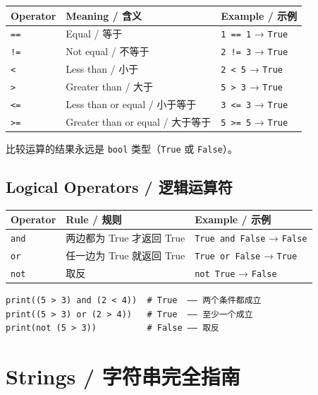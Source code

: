 \documentclass[11pt,a4paper]{report}
\let\oldtexttt\texttt
\renewcommand{\texttt}[1]{\textcolor{mainblue}{\oldtexttt{#1}}}
\begin{document}
\medskip
\centering
\renewcommand{\arraystretch}{1.6}
\begin{tabular}{@{}lll@{}}
\toprule
\textbf{Operator} & \textbf{Meaning / 含义} & \textbf{Example / 示例} \\ \midrule
\texttt{==} & Equal / 等于              & \texttt{1 == 1} → \texttt{True} \\
\texttt{!=} & Not equal / 不等于        & \texttt{2 != 3} → \texttt{True} \\
\texttt{<}  & Less than / 小于           & \texttt{2 < 5} → \texttt{True} \\
\texttt{>}  & Greater than / 大于        & \texttt{5 > 3} → \texttt{True} \\
\texttt{<=} & Less than or equal / 小于等于 & \texttt{3 <= 3} → \texttt{True} \\
\texttt{>=} & Greater than or equal / 大于等于 & \texttt{5 >= 5} → \texttt{True} \\ \bottomrule
\end{tabular}
\medskip

比较运算的结果永远是 \texttt{bool} 类型（\texttt{True} 或 \texttt{False}）。

\section{Logical Operators / 逻辑运算符}

\medskip
\centering
\renewcommand{\arraystretch}{1.6}
\begin{tabular}{@{}lll@{}}
\toprule
\textbf{Operator} & \textbf{Rule / 规则} & \textbf{Example / 示例} \\ \midrule
\texttt{and} & 两边都为 True 才返回 True & \texttt{True and False} → \texttt{False} \\
\texttt{or}  & 任一边为 True 就返回 True & \texttt{True or False} → \texttt{True} \\
\texttt{not} & 取反                    & \texttt{not True} → \texttt{False} \\ \bottomrule
\end{tabular}
\medskip

\begin{lstlisting}
print((5 > 3) and (2 < 4))  # True  —— 两个条件都成立
print((5 > 3) or (2 > 4))   # True  —— 至少一个成立
print(not (5 > 3))          # False —— 取反
\end{lstlisting}

\newpage

\chapter{Strings / 字符串完全指南}
\end{document}

